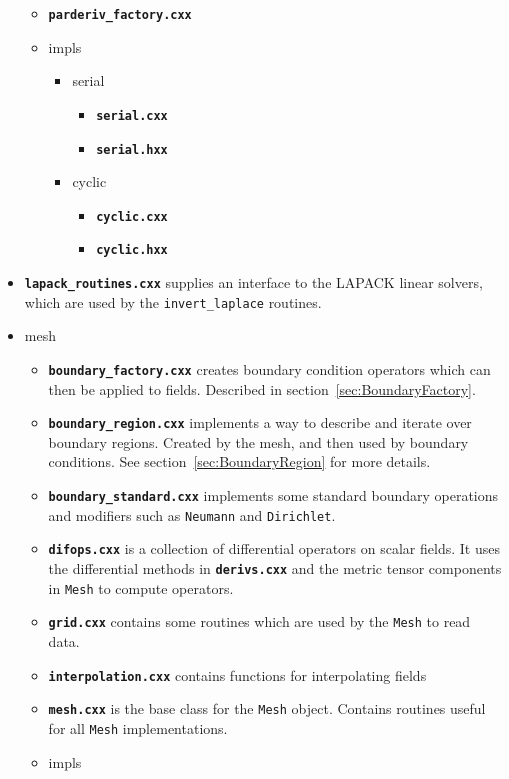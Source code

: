 \documentclass[12pt]{article}
\newcommand{\code}[1]{\texttt{#1}}
\newcommand{\file}[1]{\texttt{\bf #1}}
\begin{document}
\begin{itemize}
\begin{itemize}
  \item \file{parderiv\_factory.cxx}
  \item impls
    \begin{itemize}
    \item serial
      \begin{itemize}
      \item \file{serial.cxx}
      \item \file{serial.hxx}
      \end{itemize}
    \item cyclic
      \begin{itemize}
      \item \file{cyclic.cxx}
      \item \file{cyclic.hxx}
      \end{itemize}
    \end{itemize}
  \end{itemize}
\item \file{lapack\_routines.cxx} supplies an interface to the LAPACK linear
  solvers, which are used by the \code{invert\_laplace} routines.
\item mesh
  \begin{itemize}
  \item \file{boundary\_factory.cxx} creates boundary condition operators
    which can then be applied to fields. Described in
    section~\ref{sec:BoundaryFactory}.
  \item \file{boundary\_region.cxx} implements a way to describe and iterate
    over boundary regions. Created by the mesh, and then used by boundary
    conditions. See section~\ref{sec:BoundaryRegion} for more details.
  \item \file{boundary\_standard.cxx} implements some standard boundary
    operations and modifiers such as \code{Neumann} and \code{Dirichlet}.
  \item \file{difops.cxx} is a collection of differential operators on scalar
    fields. It uses the differential methods in \file{derivs.cxx} and the
    metric tensor components in \code{Mesh} to compute operators.
  \item \file{grid.cxx} contains some routines which are used by the \code{Mesh}
    to read data. 
  \item \file{interpolation.cxx} contains functions for interpolating fields
  \item \file{mesh.cxx} is the base class for the \code{Mesh} object. Contains
    routines useful for all \code{Mesh} implementations.
  \item impls

\end{itemize}
\end{itemize}
\end{document}
